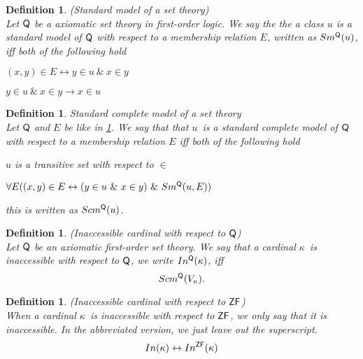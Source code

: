 \documentclass[12pt,a4paper]{article}
\newtheorem{definition}[theorem]{Definition}
\renewcommand{\iff}{\leftrightarrow}
\newcommand{\then}{\rightarrow}
\newcommand{\bce}{\begin{compactenum}}
\newcommand{\ece}{\end{compactenum}}
\begin{document}
\begin{definition}{(Standard model of a set theory)}\label{def:sm_q}\\
Let $\sf{Q}$ be a axiomatic set theory in first-order logic. We say the the a class $u$ is a standard model of $\sf{Q}$ with respect to a membership relation $E$, written as $Sm^{\sf{Q}}(u)$, iff both of the following hold
\bce[(i)]
\item $(x, y) \in E \iff y \in u\ \&\ x \in y$
\item $y \in u\ \&\ x \in y \then x \in u$
\ece
\end{definition}
\begin{definition}{Standard complete model of a set theory}\label{def:scm_q}\\
Let $\sf{Q}$ and $E$ be like in \ref{def:sm_q}. We say that that $u$ is a standard complete model of $\sf{Q}$ with respect to a membership relation $E$ iff both of the following hold
\bce[(i)]
\item $u$ is a transitive set with respect to $\in$
\item $\forall E ((x, y) \in E \iff (y \in u\ \&\ x \in y)\ \&\ Sm^{\sf{Q}}(u, E))$
\ece
this is written as $Scm^{\sf{Q}}(u)$.
\end{definition}


\begin{definition}{(Inaccessible cardinal with respect to $\sf{Q}$)}\label{def:levy_inaccessible_q}\\
Let $\sf{Q}$ be an axiomatic first-order set theory. We say that a cardinal $\kappa$ is inaccessible with respect to $\sf{Q}$, we write $In^{\sf{Q}}(\kappa)$, iff
\begin{equation}
Scm^{\sf{Q}}(V_\kappa).
\end{equation}
\end{definition}

\begin{definition}{(Inaccessible cardinal with respect to $\sf{ZF}$)}\label{def:levy_inaccessible}\\
When a cardinal $\kappa$ is inaccessible with respect to $\sf{ZF}$, we only say that it is inaccessible. In the abbreviated version, we just leave out the superscript.
\begin{equation}
In(\kappa) \iff In^{\sf{ZF}}(\kappa)
\end{equation}
\end{definition}
\end{document}
